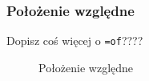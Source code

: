 \documentclass[10pt,t]{beamer}
\begin{document}
\begin{frame}
  \frametitle{Położenie względne}


  Dopisz coś więcej o \texttt{=of}????





  \begin{figure}

    \centering


    \begin{tikzpicture}







    \end{tikzpicture}


    \caption{Położenie względne}

  \end{figure}

\end{frame}
\end{document}
